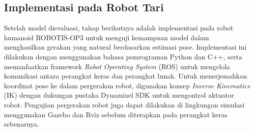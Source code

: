\subsection{Implementasi pada Robot Tari}
Setelah model dievaluasi, tahap berikutnya adalah implementasi pada robot humanoid ROBOTIS-OP3 untuk menguji kemampuan model dalam menghasilkan gerakan yang natural berdasarkan estimasi pose. Implementasi ini dilakukan dengan menggunakan bahasa pemrograman Python dan C++, serta memanfaatkan framework \textit{Robot Operating System} (ROS) untuk mengelola komunikasi antara perangkat keras dan perangkat lunak. Untuk menerjemahkan koordinat pose ke dalam pergerakan robot, digunakan konsep \textit{Inverse Kinematics} (IK) dengan dukungan pustaka Dynamixel SDK untuk mengontrol aktuator robot. Pengujian pergerakan robot juga dapat dilakukan di lingkungan simulasi menggunakan Gazebo dan Rviz sebelum diterapkan pada perangkat keras sebenarnya. 



